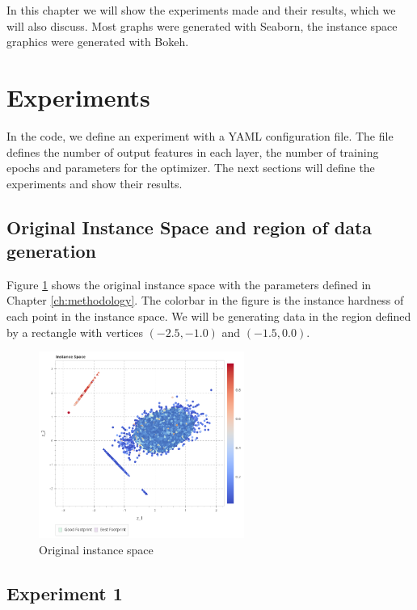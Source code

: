 In this chapter we will show the experiments made and their results, which we will also discuss. Most graphs were generated with Seaborn, the instance space graphics were generated with Bokeh.

\section{Experiments} \label{sec:experiments}

In the code, we define an experiment with a YAML configuration file. The file defines the number of output features in each layer, the number of training epochs and parameters for the optimizer. The next sections will define the experiments and show their results.

\subsection{Original Instance Space and region of data generation}

Figure \ref{fig:is_original} shows the original instance space with the parameters defined in Chapter \ref{ch:methodology}. The colorbar in the figure is the instance hardness of each point in the instance space. We will be generating data in the region defined by a rectangle with vertices $(-2.5, -1.0)$ and $(-1.5, 0.0)$.

\begin{figure}[H]
    \centering
    \includegraphics[width=0.6\textwidth]{Cap5/is_original.png}
    \caption{Original instance space}
    \label{fig:is_original}
\end{figure}

\subsection{Experiment 1}


